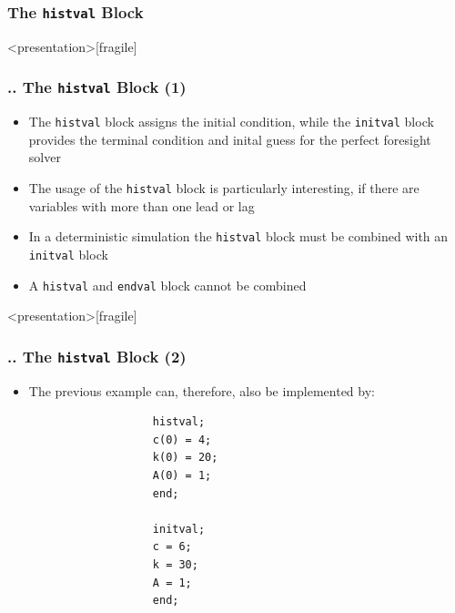 \documentclass[11pt,aspectratio=169]{beamer}
\begin{document}
\subsubsection{The \texttt{histval} Block}
\begin{frame}<presentation>[fragile]
	\frametitle{{\thesection.\thesubsection.\thesubsubsection} The \texttt{histval} Block (1)}
	\begin{itemize}
		\item The \texttt{histval} block assigns the initial condition, while the \texttt{initval} block provides the terminal condition and inital guess for the perfect foresight solver
		\item The usage of the \texttt{histval} block is particularly interesting, if there are variables with more than one lead or lag 
		\item In a deterministic simulation the \texttt{histval} block must be combined with an \texttt{initval} block 
		\item A \texttt{histval} and \texttt{endval} block cannot be combined
	\end{itemize}
\end{frame}
\begin{frame}<presentation>[fragile]
	\frametitle{{\thesection.\thesubsection.\thesubsubsection} The \texttt{histval} Block (2)}
	\begin{itemize}
		\item The previous example can, therefore, also be implemented by:
			\begin{verbatim}
				   histval;
				   c(0) = 4;
				   k(0) = 20;
				   A(0) = 1;
				   end;
				
				   initval;
				   c = 6;
				   k = 30;
				   A = 1;
				   end;
			\end{verbatim}
	\end{itemize}
\end{frame}
\end{document}
